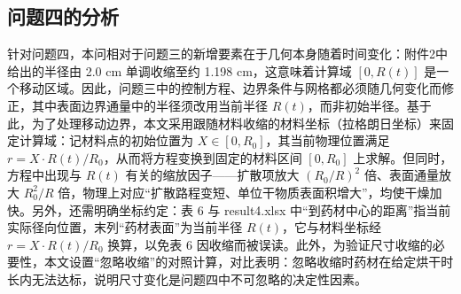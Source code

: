 \documentclass[12pt,a4paper]{article}
\newcommand{\prompt}[1]{\par\noindent\textbf{【写作提示】}#1\par}      %
\newcommand{\figph}[1]{%
  \begin{center}
  \fbox{\parbox{0.88\textwidth}{\centering\vspace{2ex}#1\vspace{2ex}}}
  \end{center}}
\newcommand{\handbook}[2]{\par\noindent\textbf{【手册索引：#1】} #2\par}
\begin{document}
\subsection{问题四的分析}
针对问题四，本问相对于问题三的新增要素在于几何本身随着时间变化：附件2中给出的半径由 2.0 cm 单调收缩至约 1.198 cm，这意味着计算域 $[0,R(t)]$ 是一个移动区域。因此，问题三中的控制方程、边界条件与网格都必须随几何变化而修正，其中表面边界通量中的半径须改用当前半径 $R(t)$，而非初始半径。基于此，为了处理移动边界，本文采用跟随材料收缩的材料坐标（拉格朗日坐标）来固定计算域：记材料点的初始位置为 $X\in[0,R_0]$，其当前物理位置满足 $r=X\cdot R(t)/R_0$，从而将方程变换到固定的材料区间 $[0,R_0]$ 上求解。但同时，方程中出现与 $R(t)$ 有关的缩放因子——扩散项放大 $(R_0/R)^2$ 倍、表面通量放大 $R_0^2/R$ 倍，物理上对应“扩散路程变短、单位干物质表面积增大”，均使干燥加快。另外，还需明确坐标约定：表 6 与 result4.xlsx 中“到药材中心的距离”指当前实际径向位置，末列“药材表面”为当前半径 $R(t)$，它与材料坐标经 $r=X\cdot R(t)/R_0$ 换算，以免表 6 因收缩而被误读。此外，为验证尺寸收缩的必要性，本文设置“忽略收缩”的对照计算，对比表明：忽略收缩时药材在给定烘干时长内无法达标，说明尺寸变化是问题四中不可忽略的决定性因素。





\end{document}

